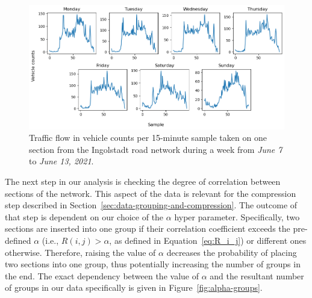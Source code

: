 \begin{figure}
	\includegraphics[width=\textwidth,keepaspectratio]{img/week_data.png}
	\centering
	\caption{Traffic flow in vehicle counts per 15-minute sample taken on one section from the Ingolstadt road network during a week from \textit{June 7} to \textit{June 13, 2021}.}
	\label{fig:week-data}
\end{figure}

The next step in our analysis is checking the degree of correlation between
sections of the network. This aspect of the data is relevant for the compression
step described in Section~\ref{sec:data-grouping-and-compression}. The outcome
of that step is dependent on our choice of the $\alpha$ hyper parameter.
Specifically, two sections are inserted into one group if their correlation
coefficient exceeds the pre-defined $\alpha$ (i.e., $R(i,j)>\alpha$, as defined
in Equation~\ref{eq:R_i_j}) or different ones otherwise. Therefore, raising the
value of $\alpha$ decreases the probability of placing two sections into one
group, thus potentially increasing the number of groups in the end. The exact
dependency between the value of $\alpha$ and the resultant number of groups in
our data specifically is given in Figure~\ref{fig:alpha-groups}.

